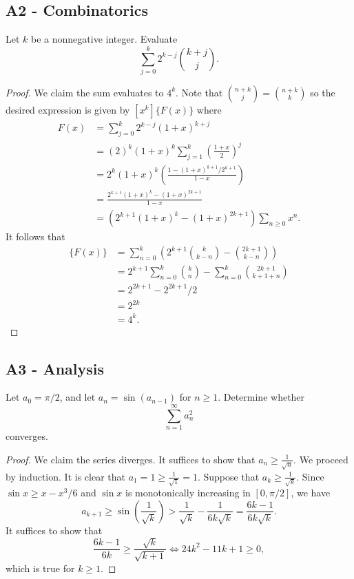 \documentclass[11pt]{scrartcl}
\newcommand{\<}{\langle}
\renewcommand{\>}{\rangle}
\begin{document}
\pagebreak
\subsection{A2 - Combinatorics}
Let $k$ be a nonnegative integer. Evaluate
\[ \sum_{j=0}^k 2^{k-j} \binom{k+j}{j}. \]
\begin{proof}
We claim the sum evaluates to $4^k$.  Note that $\binom{n + k}{j} = \binom{n + k}{k}$ so the desired expression is given by $[x^k]\{F(x)\}$ where 
\begin{align*}
F(x) &= \sum_{j=0}^k 2^{k-j} (1 + x)^{k + j} \\
&= (2)^k(1 + x)^k \sum_{j=1}^k \left (\frac{1 + x}{2} \right)^j \\
&= 2^k(1 + x)^k \left (\frac{1 - (1+x)^{k + 1}/2^{k + 1}}{1 - x} \right) \\
&= \frac{2^{k + 1}(1 + x)^k - (1 + x)^{2k + 1}}{1-x} \\
&= (2^{k + 1}(1 + x)^k - (1 + x)^{2k + 1}) \sum_{n \ge 0} x^n.
\end{align*}
It follows that 
\begin{align*}
[x^k]\{F(x)\} &=  \sum_{n=0}^k \left ( 2^{k + 1} \binom{k}{k-n} - \binom{2k + 1}{k-n}\right)\\
&= 2^{k + 1}\sum_{n=0}^k \binom{k}{n} - \sum_{n=0}^k \binom{2k + 1}{ k +1 + n} \\
&= 2^{2k+1} - 2^{2k+1}/2 \\
&= 2^{2k} \\
&= 4^k.
\end{align*}
\end{proof}

\pagebreak
\subsection{A3 - Analysis}
	Let $a_0=\pi /2$, and let $a_n=\sin (a_{n-1})$ for $n\ge 1$. Determine whether
\[ \sum_{n=1}^{\infty}a_n^2 \]converges.
\begin{proof}
We claim the series diverges.   It suffices to show that $a_n \ge \frac{1}{\sqrt{n}}$. We proceed by induction.  It is clear that $a_1 = 1 \ge \frac{1}{\sqrt{1}} = 1$.  Suppose that $a_k \ge \frac{1}{\sqrt{k}}$.  Since $\sin x \ge x - x^3 / 6$ and $\sin x$ is monotonically increasing in $[0, \pi/2]$, we have 
$$a_{k + 1} \ge \sin \left (\frac{1}{\sqrt{k}} \right) > \frac{1}{\sqrt{k}} - \frac{1}{6k\sqrt{k}} = \frac{6k-1}{6k\sqrt{k}}.$$
It suffices to show that 
$$\frac{6k-1}{6k} \ge \frac{\sqrt{k}}{\sqrt{k + 1}} \Leftrightarrow 24k^2 - 11k + 1 \ge 0,$$
which is true for $k \ge 1$.
\end{proof}
\pagebreak
\end{document}
